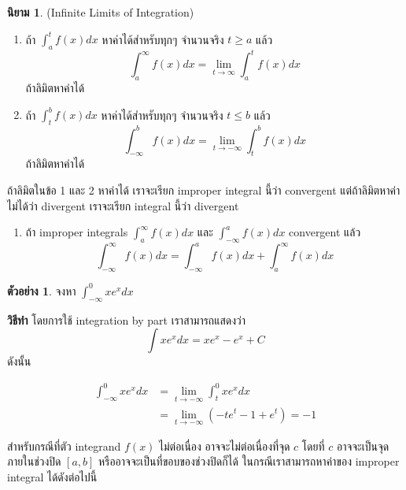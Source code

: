\documentclass[
]{book}
\providecommand{\tightlist}{%
  \setlength{\itemsep}{0pt}\setlength{\parskip}{0pt}}
\theoremstyle{definition}
\newtheorem{definition}{นิยาม}[chapter]
\theoremstyle{definition}
\newtheorem{example}{ตัวอย่าง}[chapter]
\theoremstyle{definition}
\theoremstyle{definition}
\theoremstyle{remark}
\begin{document}
\begin{definition}

(Infinite Limits of Integration)

\begin{enumerate}
\def\labelenumi{\arabic{enumi}.}
\item
  ถ้า \(\int_{a}^{t}f(x)dx\) หาค่าได้สำหรับทุกๆ จำนวนจริง \(t \ge a\) แล้ว
  \[\int_{a}^{\infty} f(x) dx  = \lim_{t \rightarrow \infty} \int_{a}^t f(x) dx\]
  ถ้าลิมิตหาค่าได้
\item
  ถ้า \(\int_{t}^{b}f(x)dx\) หาค่าได้สำหรับทุกๆ จำนวนจริง \(t \le b\) แล้ว
  \[\int_{-\infty}^{b} f(x) dx  = \lim_{t \rightarrow -\infty} \int_{t}^b f(x) dx\]
  ถ้าลิมิตหาค่าได้
\end{enumerate}

ถ้าลิมิตในข้อ 1 และ 2 หาค่าได้ เราจะเรียก improper integral นี้ว่า convergent
แต่ถ้าลิมิตหาค่าไม่ได้ว่า divergent เราจะเรียก integral นี้ว่า divergent

\begin{enumerate}
\def\labelenumi{\arabic{enumi}.}
\setcounter{enumi}{2}
\tightlist
\item
  ถ้า improper integrals \(\int_{a}^{\infty} f(x) dx\) และ
  \(\int_{-\infty}^{a} f(x) dx\) convergent แล้ว
  \[\int_{-\infty}^{\infty} f(x) dx  = 
                \int_{-\infty}^{a} f(x) dx + \int_{a}^{\infty} f(x) dx\]
\end{enumerate}

\end{definition}

\begin{example}
จงหา \(\int_{-\infty}^0 x e^x dx\)
\end{example}

\textbf{วิธีทำ} โดยการใช้ integration by part เราสามารถแสดงว่า
\[\int x e^x dx = x e^x - e^x +C\] ดังนั้น

\begin{equation}
\begin{aligned}
         \int_{-\infty}^0 x e^x dx &=  \lim_{t \rightarrow -\infty} \int_{t}^0 x e^x dx \\
                        &=  \lim_{t \rightarrow -\infty} (-t e^t -1 + e^t) = -1
\end{aligned}
\end{equation}

สำหรับกรณีที่ตัว integrand \(f(x)\) ไม่ต่อเนื่อง อาจจะไม่ต่อเนื่องที่จุด \(c\) โดยที่ \(c\)
อาจจะเป็นจุดภายในช่วงปิด \([a,b]\) หรืออาจจะเป็นที่ขอบของช่วงปิดก็ได้
ในกรณีเราสามารถหาค่าของ improper integral ได้ดังต่อไปนี้
\end{document}
